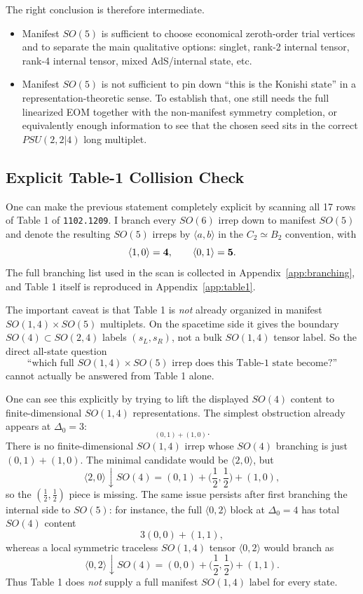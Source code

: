 \documentclass[12pt]{article}
\def\be{\begin{equation}}
\def\ee{\end{equation}}
\newcommand{\D}{\ensuremath{\Delta}}
\begin{document}
The right conclusion is therefore intermediate.
\begin{itemize}
\item Manifest $SO(5)$ is sufficient to choose economical zeroth-order trial vertices and to separate the
main qualitative options: singlet, rank-2 internal tensor, rank-4 internal tensor, mixed AdS/internal state,
etc.
\item Manifest $SO(5)$ is not sufficient to pin down ``this is the Konishi state'' in a representation-theoretic
sense. To establish that, one still needs the full linearized EOM together with the non-manifest symmetry
completion, or equivalently enough information to see that the chosen seed sits in the correct
$PSU(2,2|4)$ long multiplet.
\end{itemize}

\subsection{Explicit Table-1 Collision Check}
\label{app:table1scan}

One can make the previous statement completely explicit by scanning all 17 rows of Table 1 of
\texttt{1102.1209}. I branch every $SO(6)$ irrep down to manifest $SO(5)$ and denote the resulting
$SO(5)$ irreps by $\langle a,b\rangle$ in the $C_2\simeq B_2$ convention, with
\be
\langle 1,0\rangle = {\bf 4},\qquad \langle 0,1\rangle = {\bf 5}.
\ee
The full branching list used in the scan is collected in Appendix~\ref{app:branching}, and Table 1 itself
is reproduced in Appendix~\ref{app:table1}.

The important caveat is that Table 1 is \emph{not} already organized in manifest
$SO(1,4)\times SO(5)$ multiplets. On the spacetime side it gives the boundary
$SO(4)\subset SO(2,4)$ labels $(s_L,s_R)$, not a bulk $SO(1,4)$ tensor label.
So the direct all-state question
\be
\text{``which full }SO(1,4)\times SO(5)\text{ irrep does this Table-1 state become?''}
\ee
cannot actually be answered from Table 1 alone.

One can see this explicitly by trying to lift the displayed $SO(4)$ content to finite-dimensional
$SO(1,4)$ representations. The simplest obstruction already appears at $\D_0=3$:
\be
[0,1,0]_{(0,1)+(1,0)}.
\ee
There is no finite-dimensional $SO(1,4)$ irrep whose $SO(4)$ branching is just $(0,1)+(1,0)$.
The minimal candidate would be $\langle 2,0\rangle$, but
\be
\langle 2,0\rangle \downarrow SO(4)=(0,1)+\Big(\frac12,\frac12\Big)+(1,0),
\ee
so the $(\frac12,\frac12)$ piece is missing. The same issue persists after first branching the
internal side to $SO(5)$: for instance, the full $\langle 0,2\rangle$ block at $\D_0=4$ has total
$SO(4)$ content
\be
3(0,0)+(1,1),
\ee
whereas a local symmetric traceless $SO(1,4)$ tensor $\langle 0,2\rangle$ would branch as
\be
\langle 0,2\rangle \downarrow SO(4)=(0,0)+\Big(\frac12,\frac12\Big)+(1,1).
\ee
Thus Table 1 does \emph{not} supply a full manifest $SO(1,4)$ label for every state.
\end{document}
